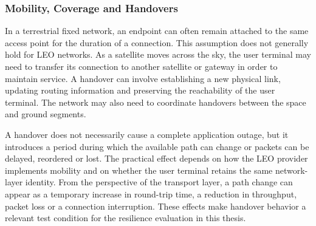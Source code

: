 \subsubsection{Mobility, Coverage and Handovers}
In a terrestrial fixed network, an endpoint can often remain attached to the same access point for the duration of a connection. This assumption does not generally hold for LEO networks. As a satellite moves across the sky, the user terminal may need to transfer its connection to another satellite or gateway in order to maintain service. A handover can involve establishing a new physical link, updating routing information and preserving the reachability of the user terminal. The network may also need to coordinate handovers between the space and ground segments.~\citep{Sun2014}
\par
A handover does not necessarily cause a complete application outage, but it introduces a period during which the available path can change or packets can be delayed, reordered or lost. The practical effect depends on how the LEO provider implements mobility and on whether the user terminal retains the same network-layer identity. From the perspective of the transport layer, a path change can appear as a temporary increase in round-trip time, a reduction in throughput, packet loss or a connection interruption. These effects make handover behavior a relevant test condition for the resilience evaluation in this thesis.
